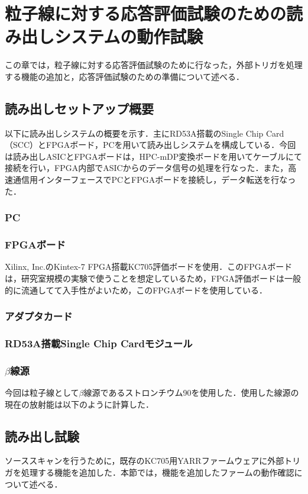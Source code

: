 \chapter{粒子線に対する応答評価試験のための読み出しシステムの動作試験}
この章では，粒子線に対する応答評価試験のために行なった，外部トリガを処理する機能の追加と，応答評価試験のための準備について述べる．

\section{読み出しセットアップ概要}
以下に読み出しシステムの概要を示す．主にRD53A搭載のSingle Chip Card（SCC）とFPGAボード，PCを用いて読み出しシステムを構成している．今回は読み出しASICとFPGAボードは，HPC-mDP変換ボードを用いてケーブルにて接続を行い，FPGA内部でASICからのデータ信号の処理を行なった．また，高速通信用インターフェースでPCとFPGAボードを接続し，データ転送を行なった．\\

\subsection{PC}
\subsection{FPGAボード}
Xilinx, Inc.のKintex-7 FPGA搭載KC705評価ボードを使用．このFPGAボードは，研究室規模の実験で使うことを想定しているため，FPGA評価ボードは一般的に流通してて入手性がよいため，このFPGAボードを使用している．
\subsection{アダプタカード}
\subsection{RD53A搭載Single Chip Cardモジュール}
\subsection{$\beta$線源}
今回は粒子線として$\beta$線源であるストロンチウム90を使用した．使用した線源の現在の放射能は以下のように計算した．

\section{読み出し試験}
ソーススキャンを行うために，既存のKC705用YARRファームウェアに外部トリガを処理する機能を追加した．本節では，機能を追加したファームの動作確認について述べる．

